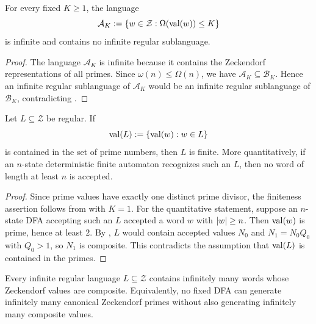 \begin{corollary}
  \label{cor:bounded-almost-prime-zeckendorf-languages-reg-immune}
  For every fixed \(K\ge1\), the language
  \[
    \mathcal A_K
      :=\{w\in\mathcal Z:\Omega(\operatorname{val}(w))\le K\}
  \]
  is infinite and contains no infinite regular sublanguage.
\end{corollary}

\begin{proof}
  The language \(\mathcal A_K\) is infinite because it contains the
  Zeckendorf representations of all primes. Since
  \(\omega(n)\le\Omega(n)\), we have
  \(\mathcal A_K\subseteq\mathcal B_K\). Hence an infinite regular
  sublanguage of \(\mathcal A_K\) would be an infinite regular
  sublanguage of \(\mathcal B_K\), contradicting
  .
\end{proof}

\begin{corollary}
  \label{thm:zeckendorf-schutzenberger-regular-immunity}
  Let \(L\subseteq\mathcal Z\) be regular. If
  \[
    \operatorname{val}(L):=\{\operatorname{val}(w):w\in L\}
  \]
  is contained in the set of prime numbers, then \(L\) is finite. More
  quantitatively, if an \(n\)-state deterministic finite automaton
  recognizes such an \(L\), then no word of length at least \(n\) is
  accepted.
\end{corollary}

\begin{proof}
  Since prime values have exactly one distinct prime divisor, the
  finiteness assertion follows from
  with \(K=1\). For the quantitative statement, suppose an \(n\)-state
  DFA accepting such an \(L\) accepted a word \(w\) with \(\lvert w \rvert\ge n\).
  Then \(\operatorname{val}(w)\) is prime, hence at least \(2\). By
  , \(L\) would contain
  accepted values \(N_0\) and \(N_1=N_0Q_0\) with \(Q_0>1\), so
  \(N_1\) is composite. This contradicts the assumption that
  \(\operatorname{val}(L)\) is contained in the primes.
\end{proof}

\begin{corollary}
  \label{cor:regular-zeckendorf-languages-contain-composites}
  Every infinite regular language \(L\subseteq\mathcal Z\) contains
  infinitely many words whose Zeckendorf values are composite.
  Equivalently, no fixed DFA can generate infinitely many canonical
  Zeckendorf primes without also generating infinitely many composite
  values.
\end{corollary}


